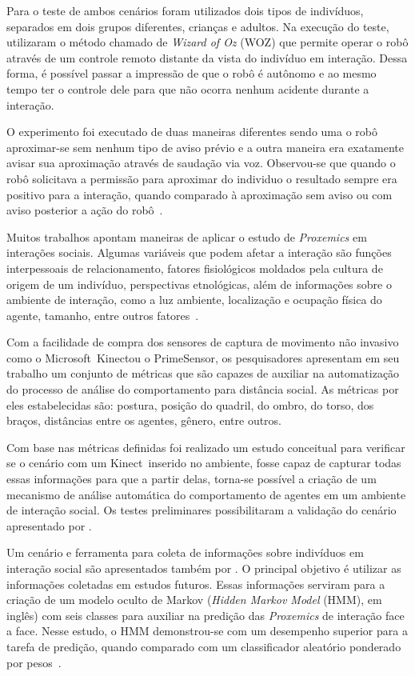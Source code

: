 Para o teste de ambos cenários foram utilizados dois tipos de indivíduos, separados em dois grupos diferentes, crianças e adultos. Na execução do teste,  utilizaram o método chamado de \emph{Wizard of Oz} (WOZ) que permite operar o robô através de um controle remoto distante da vista do indivíduo em interação. Dessa forma, é possível passar a impressão de que o robô é autônomo e ao mesmo tempo ter o controle dele para que não ocorra nenhum acidente durante a interação.

O experimento foi executado de duas maneiras diferentes sendo uma o robô aproximar-se sem nenhum tipo de aviso prévio e a outra maneira era exatamente avisar sua aproximação através de saudação via voz. Observou-se que quando o robô solicitava a permissão para aproximar do individuo o resultado sempre era positivo para a interação, quando comparado à aproximação sem aviso ou com aviso posterior a ação do robô~\cite{okita:2012}.

Muitos trabalhos apontam maneiras de aplicar o estudo de \emph{Proxemics} em interações sociais. Algumas variáveis que podem afetar a interação são funções interpessoais de relacionamento, fatores fisiológicos moldados pela cultura de origem de um indivíduo, perspectivas etnológicas, além de informações sobre o ambiente de interação, como a luz ambiente, localização e ocupação física do agente, tamanho, entre outros fatores~\cite{mead:2011b}.

Com a facilidade de compra dos sensores de captura de movimento não invasivo como o Microsoft\textregistered\ Kinect\textregistered ou o PrimeSensor\textregistered, os pesquisadores  apresentam em seu trabalho um conjunto de métricas que são capazes de auxiliar na automatização do processo de análise do comportamento para distância social. As métricas por eles estabelecidas são: postura, posição do quadril, do ombro, do torso, dos braços, distâncias entre os agentes, gênero, entre outros.

Com base nas métricas definidas foi realizado um estudo conceitual para verificar se o cenário com um Kinect\textregistered\ inserido no ambiente, fosse capaz de capturar todas essas informações para que a partir delas, torna-se possível a criação de um mecanismo de análise automática do comportamento de agentes em um ambiente de interação social. Os testes preliminares possibilitaram a validação do cenário apresentado por .

Um cenário e ferramenta para coleta de informações sobre indivíduos em interação social são apresentados também por . O principal objetivo é utilizar as informações coletadas em estudos futuros. Essas informações serviram para a criação de um modelo oculto de Markov (\emph{Hidden Markov Model} (HMM), em inglês) com seis classes para auxiliar na predição das \emph{Proxemics} de interação face a face. Nesse estudo, o HMM demonstrou-se com um desempenho superior para a tarefa de predição, quando comparado com um classificador aleatório ponderado por pesos~\cite{mead:2011}.

